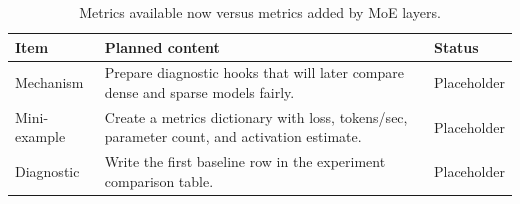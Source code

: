\begin{table}[H]
\centering
\caption{Metrics available now versus metrics added by MoE layers.}
\label{tab:ch02-baseline-diagnostics-and-comparison-slots}
\begin{tabularx}{\textwidth}{p{}X p{}}
\toprule
Item & Planned content & Status \\
\midrule
Mechanism & Prepare diagnostic hooks that will later compare dense and sparse models fairly. & Placeholder \\
Mini-example & Create a metrics dictionary with loss, tokens/sec, parameter count, and activation estimate. & Placeholder \\
Diagnostic & Write the first baseline row in the experiment comparison table. & Placeholder \\
\bottomrule
\end{tabularx}
\end{table}
